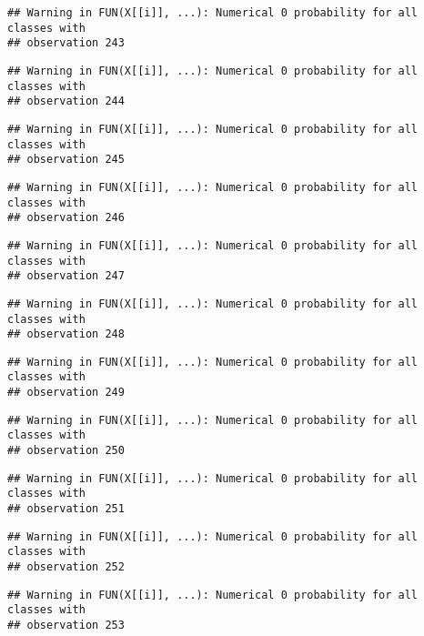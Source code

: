 \documentclass[
]{article}
\begin{document}
\begin{verbatim}
## Warning in FUN(X[[i]], ...): Numerical 0 probability for all classes with
## observation 243
\end{verbatim}

\begin{verbatim}
## Warning in FUN(X[[i]], ...): Numerical 0 probability for all classes with
## observation 244
\end{verbatim}

\begin{verbatim}
## Warning in FUN(X[[i]], ...): Numerical 0 probability for all classes with
## observation 245
\end{verbatim}

\begin{verbatim}
## Warning in FUN(X[[i]], ...): Numerical 0 probability for all classes with
## observation 246
\end{verbatim}

\begin{verbatim}
## Warning in FUN(X[[i]], ...): Numerical 0 probability for all classes with
## observation 247
\end{verbatim}

\begin{verbatim}
## Warning in FUN(X[[i]], ...): Numerical 0 probability for all classes with
## observation 248
\end{verbatim}

\begin{verbatim}
## Warning in FUN(X[[i]], ...): Numerical 0 probability for all classes with
## observation 249
\end{verbatim}

\begin{verbatim}
## Warning in FUN(X[[i]], ...): Numerical 0 probability for all classes with
## observation 250
\end{verbatim}

\begin{verbatim}
## Warning in FUN(X[[i]], ...): Numerical 0 probability for all classes with
## observation 251
\end{verbatim}

\begin{verbatim}
## Warning in FUN(X[[i]], ...): Numerical 0 probability for all classes with
## observation 252
\end{verbatim}

\begin{verbatim}
## Warning in FUN(X[[i]], ...): Numerical 0 probability for all classes with
## observation 253
\end{verbatim}
\end{document}
